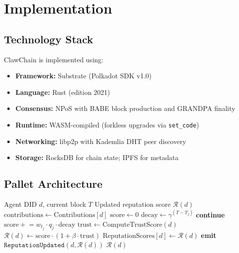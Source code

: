 \documentclass{article}
\begin{document}

\section{Implementation}\label{sec:implementation}

\subsection{Technology Stack}

ClawChain is implemented using:
\begin{itemize}
    \item \textbf{Framework:} Substrate (Polkadot SDK v1.0)~\cite{parity_substrate}
    \item \textbf{Language:} Rust (edition 2021)
    \item \textbf{Consensus:} NPoS with BABE block production and GRANDPA finality
    \item \textbf{Runtime:} WASM-compiled (forkless upgrades via \texttt{set\_code})
    \item \textbf{Networking:} libp2p with Kademlia DHT peer discovery
    \item \textbf{Storage:} RocksDB for chain state; IPFS for metadata
\end{itemize}

\subsection{Pallet Architecture}

\begin{algorithm}[t]
\caption{Reputation Score Computation (On-Chain)}
\label{alg:reputation}
\begin{algorithmic}[1]
\REQUIRE Agent DID $d$, current block $T$
\ENSURE Updated reputation score $\mathcal{R}(d)$
\STATE $\text{contributions} \leftarrow \text{Contributions}[d]$
\STATE $\text{score} \leftarrow 0$
    \STATE $\text{decay} \leftarrow \gamma^{(T - T_j)}$ 
        \STATE \textbf{continue} 
    \ENDIF
    \STATE $\text{score} \mathrel{+}= w_{t_j} \cdot q_j \cdot \text{decay}$
\ENDFOR
\STATE $\text{trust} \leftarrow \text{ComputeTrustScore}(d)$ 
\STATE $\mathcal{R}(d) \leftarrow \text{score} \cdot (1 + \beta \cdot \text{trust})$ 
\STATE $\text{ReputationScores}[d] \leftarrow \mathcal{R}(d)$
\STATE \textbf{emit} $\texttt{ReputationUpdated}(d, \mathcal{R}(d))$
\RETURN $\mathcal{R}(d)$
\end{algorithmic}
\end{algorithm}
\end{document}
